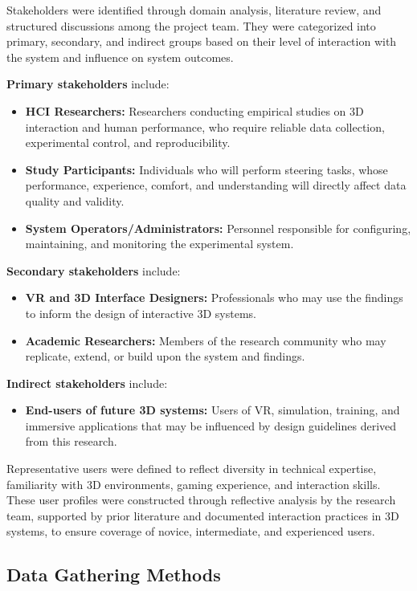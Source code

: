 \documentclass[sigconf]{acmart}
\begin{document}
Stakeholders were identified through domain analysis, literature review, and structured discussions among the project team. They were categorized into primary, secondary, and indirect groups based on their level of interaction with the system and influence on system outcomes.

\textbf{Primary stakeholders} include:
\begin{itemize}
  \item \textbf{HCI Researchers:} Researchers conducting empirical studies on 3D interaction and human performance, who require reliable data collection, experimental control, and reproducibility.
  \item \textbf{Study Participants:} Individuals who will perform steering tasks, whose performance, experience, comfort, and understanding will directly affect data quality and validity.
  \item \textbf{System Operators/Administrators:} Personnel responsible for configuring, maintaining, and monitoring the experimental system.
\end{itemize}

\textbf{Secondary stakeholders} include:
\begin{itemize}
  \item \textbf{VR and 3D Interface Designers:} Professionals who may use the findings to inform the design of interactive 3D systems.
  \item \textbf{Academic Researchers:} Members of the research community who may replicate, extend, or build upon the system and findings.
\end{itemize}

\textbf{Indirect stakeholders} include:
\begin{itemize}
  \item \textbf{End-users of future 3D systems:} Users of VR, simulation, training, and immersive applications that may be influenced by design guidelines derived from this research.
\end{itemize}

Representative users were defined to reflect diversity in technical expertise, familiarity with 3D environments, gaming experience, and interaction skills. These user profiles were constructed through reflective analysis by the research team, supported by prior literature and documented interaction practices in 3D systems, to ensure coverage of novice, intermediate, and experienced users.

\subsection{Data Gathering Methods}
\end{document}
